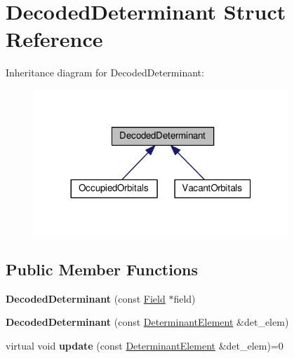 \hypertarget{structDecodedDeterminant}{}\section{Decoded\+Determinant Struct Reference}
\label{structDecodedDeterminant}


Inheritance diagram for Decoded\+Determinant\+:\nopagebreak
\begin{figure}[H]
\begin{center}
\leavevmode
\includegraphics[width=272pt]{structDecodedDeterminant__inherit__graph}
\end{center}
\end{figure}
\subsection*{Public Member Functions}
\begin{DoxyCompactItemize}
\item 
{\bfseries Decoded\+Determinant} (const \hyperlink{classField}{Field} $\ast$field)\hypertarget{structDecodedDeterminant_a0735455c5d917595573d4710dd8fe61a}{}\label{structDecodedDeterminant_a0735455c5d917595573d4710dd8fe61a}

\item 
{\bfseries Decoded\+Determinant} (const \hyperlink{classDeterminantElement}{Determinant\+Element} \&det\+\_\+elem)\hypertarget{structDecodedDeterminant_a694c656a8d47a8637fff4bd23f3bc543}{}\label{structDecodedDeterminant_a694c656a8d47a8637fff4bd23f3bc543}

\item 
virtual void {\bfseries update} (const \hyperlink{classDeterminantElement}{Determinant\+Element} \&det\+\_\+elem)=0\hypertarget{structDecodedDeterminant_a9d957e501d01a230a41521595377f66d}{}\label{structDecodedDeterminant_a9d957e501d01a230a41521595377f66d}

\end{DoxyCompactItemize}
